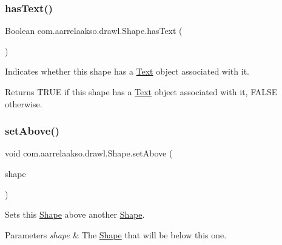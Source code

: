 \subsubsection{\texorpdfstring{has\+Text()}{hasText()}}
{\footnotesize\ttfamily Boolean com.\+aarrelaakso.\+drawl.\+Shape.\+has\+Text (\begin{DoxyParamCaption}{ }\end{DoxyParamCaption})\hspace{0.3cm}{\ttfamily [inherited]}}



Indicates whether this shape has a \hyperlink{classcom_1_1aarrelaakso_1_1drawl_1_1_text}{Text} object associated with it. 

\begin{DoxyReturn}{Returns}
T\+R\+UE if this shape has a \hyperlink{classcom_1_1aarrelaakso_1_1drawl_1_1_text}{Text} object associated with it, F\+A\+L\+SE otherwise. 
\end{DoxyReturn}
\mbox{\label{classcom_1_1aarrelaakso_1_1drawl_1_1_shape_a4deb22d64fef2115a0bc4802e8dba682}} 
\subsubsection{\texorpdfstring{set\+Above()}{setAbove()}\hspace{0.1cm}{\footnotesize\ttfamily [1/2]}}
{\footnotesize\ttfamily void com.\+aarrelaakso.\+drawl.\+Shape.\+set\+Above (\begin{DoxyParamCaption}\item[{@Not\+Null final \hyperlink{classcom_1_1aarrelaakso_1_1drawl_1_1_shape}{Shape}}]{shape }\end{DoxyParamCaption})\hspace{0.3cm}{\ttfamily [inherited]}}



Sets this \hyperlink{classcom_1_1aarrelaakso_1_1drawl_1_1_shape}{Shape} above another \hyperlink{classcom_1_1aarrelaakso_1_1drawl_1_1_shape}{Shape}. 


\begin{DoxyParams}{Parameters}
{\em shape} & The \hyperlink{classcom_1_1aarrelaakso_1_1drawl_1_1_shape}{Shape} that will be below this one. \\
\hline
\end{DoxyParams}
\mbox{\label{classcom_1_1aarrelaakso_1_1drawl_1_1_shape_aad0b2fb173c0112b71b06cf90709acc3}} 
